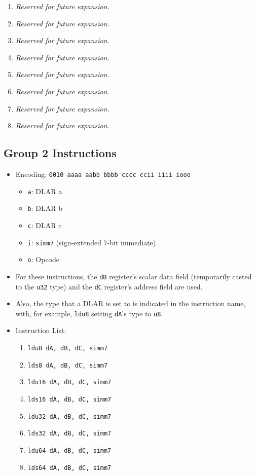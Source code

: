 \documentclass{article}
\begin{document}
\begin{itemize}
\begin{enumerate}
			\item \textit{Reserved for future expansion.}
			\item \textit{Reserved for future expansion.}
			\item \textit{Reserved for future expansion.}
			\item \textit{Reserved for future expansion.}

			\item \textit{Reserved for future expansion.}
			\item \textit{Reserved for future expansion.}
			\item \textit{Reserved for future expansion.}
			\item \textit{Reserved for future expansion.}
			\end{enumerate}
		\end{itemize}

	\subsection{Group 2 Instructions}
		\begin{itemize}
		\item Encoding: \texttt{0010 aaaa aabb bbbb  cccc ccii iiii iooo}
			\begin{itemize}
			\item \texttt{a}: DLAR a
			\item \texttt{b}: DLAR b
			\item \texttt{c}: DLAR c
			\item \texttt{i}: \texttt{simm7} (sign-extended 7-bit
				immediate)
			\item \texttt{o}: Opcode
			\end{itemize}
		\item For these instructions, the \texttt{dB} register's scalar
			data field (temporarily casted to the \texttt{u32} type) and
			the \texttt{dC} register's address field are used. 
		\item Also, the type that a DLAR is set to is indicated in the
			instruction name, with, for example, \texttt{ldu8} setting
			\texttt{dA}'s type to \texttt{u8}.
		\item Instruction List:
			\begin{enumerate}
			\item \texttt{ldu8 dA, dB, dC, simm7}
			\item \texttt{lds8 dA, dB, dC, simm7}
			\item \texttt{ldu16 dA, dB, dC, simm7}
			\item \texttt{lds16 dA, dB, dC, simm7}
			\item \texttt{ldu32 dA, dB, dC, simm7}
			\item \texttt{lds32 dA, dB, dC, simm7}
			\item \texttt{ldu64 dA, dB, dC, simm7}
			\item \texttt{lds64 dA, dB, dC, simm7}
			\end{enumerate}
		\end{itemize}
		\newpage
\end{document}
